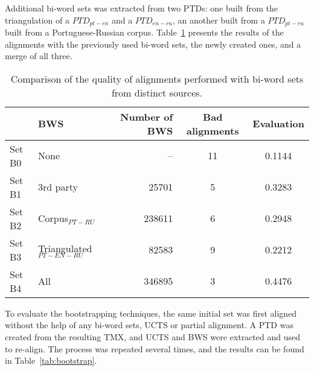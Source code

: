 \documentclass[a4paper,russian,UKenglish]{oasics}
\def\UCTSS{{\sc UCTS}}
\def\BWS{bi-word sets}
\begin{document}
Additional \BWS{} was extracted from two PTDs: one built from the triangulation of a $PTD_{pt-en}$ and a $PTD_{en-ru}$, an another built from a $PTD_{pt-ru}$ built from a Portuguese-Russian corpus. Table~\ref{tab:bwscomp} presents the results of the alignments with the previously used \BWS{}, the newly created ones, and a merge of all three.

\begin{table}[htb]
\centering
\caption{Comparison of the quality of alignments performed with \BWS{} from distinct sources.}
\label{tab:bwscomp}
\begin{tabular}{|l|l|r|c|c|}
\hline
       & \textbf{BWS}              & {\parbox{2cm}{\centering\textbf{Number of BWS}}}&\rule{0cm}{.5cm}{\parbox{2cm}{\centering\textbf{Bad alignments}}} &   \textbf{Evaluation} \\\hline\hline
Set B0 & None                      &     --                    &                       11                                         &         0.1144        \\
Set B1 & 3rd party                 &     25701                 &                        5                                         &         0.3283        \\
Set B2 & Corpus$_{PT-RU}$          &    238611                 &                        6                                         &         0.2948        \\
Set B3 & Triangulated$_{PT-EN-RU}$ &     82583                 &                        9                                         &         0.2212        \\
Set B4 & All                       &    346895                 &                        3                                         &         0.4476        \\\hline
\end{tabular}
\end{table}

To evaluate the bootstrapping techniques, the same initial set was first aligned without the help of any \BWS{}, \UCTSS{} or partial alignment. A PTD was created from the resulting TMX, and UCTS and BWS were extracted and used to re-align. The process was repeated several times, and the results can be found in Table~\ref{tab:bootstrap}\footnotemark[2].

\end{document}
